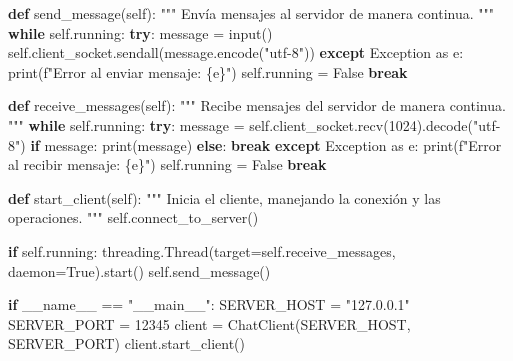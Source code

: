 \documentclass[
  a4paper,
  DIV=11,
  numbers=noendperiod,
  onepage,
  openany]{scrreprt}
\newenvironment{Shaded}{\begin{snugshade}}{\end{snugshade}}
\newcommand{\BuiltInTok}[1]{\textcolor[rgb]{0.00,0.23,0.31}{#1}}
\newcommand{\CommentTok}[1]{\textcolor[rgb]{0.37,0.37,0.37}{#1}}
\newcommand{\ControlFlowTok}[1]{\textcolor[rgb]{0.00,0.23,0.31}{\textbf{#1}}}
\newcommand{\DecValTok}[1]{\textcolor[rgb]{0.68,0.00,0.00}{#1}}
\newcommand{\ImportTok}[1]{\textcolor[rgb]{0.00,0.46,0.62}{#1}}
\newcommand{\KeywordTok}[1]{\textcolor[rgb]{0.00,0.23,0.31}{\textbf{#1}}}
\newcommand{\NormalTok}[1]{\textcolor[rgb]{0.00,0.23,0.31}{#1}}
\newcommand{\OperatorTok}[1]{\textcolor[rgb]{0.37,0.37,0.37}{#1}}
\newcommand{\PreprocessorTok}[1]{\textcolor[rgb]{0.68,0.00,0.00}{#1}}
\newcommand{\SpecialCharTok}[1]{\textcolor[rgb]{0.37,0.37,0.37}{#1}}
\newcommand{\SpecialStringTok}[1]{\textcolor[rgb]{0.13,0.47,0.30}{#1}}
\newcommand{\StringTok}[1]{\textcolor[rgb]{0.13,0.47,0.30}{#1}}
\newcommand{\VariableTok}[1]{\textcolor[rgb]{0.07,0.07,0.07}{#1}}
\begin{document}
\begin{Shaded}
\begin{Highlighting}[]
    \KeywordTok{def}\NormalTok{ send\_message(}\VariableTok{self}\NormalTok{):}
        \CommentTok{"""}
\CommentTok{        Envía mensajes al servidor de manera continua.}
\CommentTok{        """}
        \ControlFlowTok{while} \VariableTok{self}\NormalTok{.running:}
            \ControlFlowTok{try}\NormalTok{:}
\NormalTok{                message }\OperatorTok{=} \BuiltInTok{input}\NormalTok{()}
                \VariableTok{self}\NormalTok{.client\_socket.sendall(message.encode(}\StringTok{"utf{-}8"}\NormalTok{))}
            \ControlFlowTok{except} \PreprocessorTok{Exception} \ImportTok{as}\NormalTok{ e:}
                \BuiltInTok{print}\NormalTok{(}\SpecialStringTok{f"Error al enviar mensaje: }\SpecialCharTok{\{}\NormalTok{e}\SpecialCharTok{\}}\SpecialStringTok{"}\NormalTok{)}
                \VariableTok{self}\NormalTok{.running }\OperatorTok{=} \VariableTok{False}
                \ControlFlowTok{break}

    \KeywordTok{def}\NormalTok{ receive\_messages(}\VariableTok{self}\NormalTok{):}
        \CommentTok{"""}
\CommentTok{        Recibe mensajes del servidor de manera continua.}
\CommentTok{        """}
        \ControlFlowTok{while} \VariableTok{self}\NormalTok{.running:}
            \ControlFlowTok{try}\NormalTok{:}
\NormalTok{                message }\OperatorTok{=} \VariableTok{self}\NormalTok{.client\_socket.recv(}\DecValTok{1024}\NormalTok{).decode(}\StringTok{"utf{-}8"}\NormalTok{)}
                \ControlFlowTok{if}\NormalTok{ message:}
                    \BuiltInTok{print}\NormalTok{(message)}
                \ControlFlowTok{else}\NormalTok{:}
                    \ControlFlowTok{break}
            \ControlFlowTok{except} \PreprocessorTok{Exception} \ImportTok{as}\NormalTok{ e:}
                \BuiltInTok{print}\NormalTok{(}\SpecialStringTok{f"Error al recibir mensaje: }\SpecialCharTok{\{}\NormalTok{e}\SpecialCharTok{\}}\SpecialStringTok{"}\NormalTok{)}
                \VariableTok{self}\NormalTok{.running }\OperatorTok{=} \VariableTok{False}
                \ControlFlowTok{break}

    \KeywordTok{def}\NormalTok{ start\_client(}\VariableTok{self}\NormalTok{):}
        \CommentTok{"""}
\CommentTok{        Inicia el cliente, manejando la conexión y las operaciones.}
\CommentTok{        """}
        \VariableTok{self}\NormalTok{.connect\_to\_server()}

        \ControlFlowTok{if} \VariableTok{self}\NormalTok{.running:}
\NormalTok{            threading.Thread(target}\OperatorTok{=}\VariableTok{self}\NormalTok{.receive\_messages, daemon}\OperatorTok{=}\VariableTok{True}\NormalTok{).start()}
            \VariableTok{self}\NormalTok{.send\_message()}


\ControlFlowTok{if} \VariableTok{\_\_name\_\_} \OperatorTok{==} \StringTok{"\_\_main\_\_"}\NormalTok{:}
\NormalTok{    SERVER\_HOST }\OperatorTok{=} \StringTok{"127.0.0.1"}
\NormalTok{    SERVER\_PORT }\OperatorTok{=} \DecValTok{12345}
\NormalTok{    client }\OperatorTok{=}\NormalTok{ ChatClient(SERVER\_HOST, SERVER\_PORT)}
\NormalTok{    client.start\_client()}
\end{Highlighting}
\end{Shaded}
\end{document}
